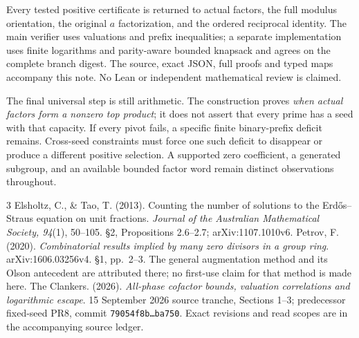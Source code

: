 \documentclass[10pt,a4paper]{article}
\begin{document}
Every tested positive certificate is returned to actual factors, the full
modulus orientation, the original $a$ factorization, and the ordered
reciprocal identity. The main verifier uses valuations and prefix inequalities;
a separate implementation uses finite logarithms and parity-aware bounded
knapsack and agrees on the complete branch digest. The source, exact JSON,
full proofs and typed maps accompany this note. No Lean or independent
mathematical review is claimed.

The final universal step is still arithmetic. The construction proves
\emph{when actual factors form a nonzero top product}; it does not assert
that every prime has a seed with that capacity. If every pivot fails, a
specific finite binary-prefix deficit remains. Cross-seed constraints must
force one such deficit to disappear or produce a different positive selection.
A supported zero coefficient, a generated subgroup, and an available bounded
factor word remain distinct observations throughout.

\begingroup\small
\begin{thebibliography}{3}
 Elsholtz, C., \& Tao, T. (2013). Counting the number of solutions
to the Erd\H{o}s--Straus equation on unit fractions.
\emph{Journal of the Australian Mathematical Society, 94}(1), 50--105.
\S2, Propositions 2.6--2.7; arXiv:1107.1010v6.
 Petrov, F. (2020). \emph{Combinatorial results implied by many
zero divisors in a group ring}. arXiv:1606.03256v4. \S1, pp.~2--3.
The general augmentation method and its Olson antecedent are attributed there;
no first-use claim for that method is made here.
 The Clankers. (2026). \emph{All-phase cofactor bounds, valuation
correlations and logarithmic escape}. 15 September 2026 source tranche,
Sections 1--3; predecessor fixed-seed PR8, commit \texttt{79054f8b\ldots{}ba750}.
Exact revisions and read scopes are in the accompanying source ledger.
\end{thebibliography}\endgroup
\end{document}
